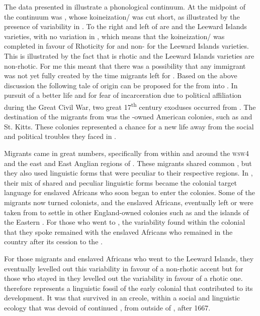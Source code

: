 The data presented in  illustrate a phonological continuum. At the midpoint of the continuum was , whose koineization/ was cut short, as illustrated by the presence of variability in . To the right and left of  are  and the Leeward Islands varieties, with no variation in , which means that the koineization/ was completed in favour of Rhoticity for  and non- for the Leeward Islands varieties. This is illustrated by the fact that  is rhotic and the Leeward Islands varieties are non-rhotic. For me this meant that there was a possibility that any  immigrant  was not yet fully created by the time migrants left  for . Based on the above discussion the following tale of origin can be proposed for the  from  into . In pursuit of a better life and for fear of incarceration due to political affiliation during the Great Civil War, two great 17\textsuperscript{th} century exoduses occurred from . The destination of the migrants from  was the -owned American colonies, such as  and St. Kitts. These colonies represented a chance for a new life away from the social and political troubles they faced in .

Migrants came in great numbers, specifically from within and around the \textsc{wsw4} and the east and East Anglian regions of . These migrants shared common , but they also used linguistic forms that were peculiar to their respective regions. In , their mix of shared and peculiar linguistic forms became the colonial target language for enslaved Africans who soon began to enter the colonies. Some of the migrants now turned colonists, and the enslaved Africans, eventually left or were taken from  to settle in other England-owned colonies such as  and the islands of the Eastern . For those who went to , the variability found within the colonial  that they spoke remained with the enslaved Africans who remained in the country after its cession to the .

For those migrants and enslaved Africans who went to the Leeward Islands, they eventually levelled out this variability in favour of a non-rhotic accent but for those who stayed in  they levelled out the variability in favour of a rhotic one.  therefore represents a linguistic fossil of the early colonial  that contributed to its development. It was   that survived in an  creole, within a social and linguistic ecology that was devoid of continued   , from outside of , after 1667.

